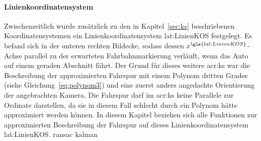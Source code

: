 \paragraph{Linienkoordinatensystem \dcfirstauthorshort}
Zwischenzeitlich wurde zusätzlich zu den in Kapitel~\ref{sec:ks} beschriebenen Koordinatensystemen ein Linienkoordinatensystem \gls{lat:LinienKOS} festgelegt. Es befand sich in der unteren rechten Bildecke, sodass dessen \( x^{\gls{lat:LinienKOS}} \)-Achse parallel zu der erwarteten Fahrbahnmarkierung verläuft, wenn das Auto auf einem geraden Abschnitt fährt. Der Grund für dieses weitere \gls{acr:ks} war die Beschreibung der approximierten Fahrspur mit einem Polynom dritten Grades (siehe Gleichung~\ref{eq:polynom3}) und eine zuerst anders angedachte Orientierung der angebrachten Kamera. Die Fahrspur darf im \gls{acr:ks} keine Parallele zur Ordinate darstellen, da sie in diesem Fall schlecht durch ein Polynom hätte approximiert werden können. In diesem Kapitel beziehen sich alle Funktionen zur approximierten Beschreibung der Fahrspur auf dieses Linienkoordinatensystem \gls{lat:LinienKOS}. 
{ransac}
{kalman}
